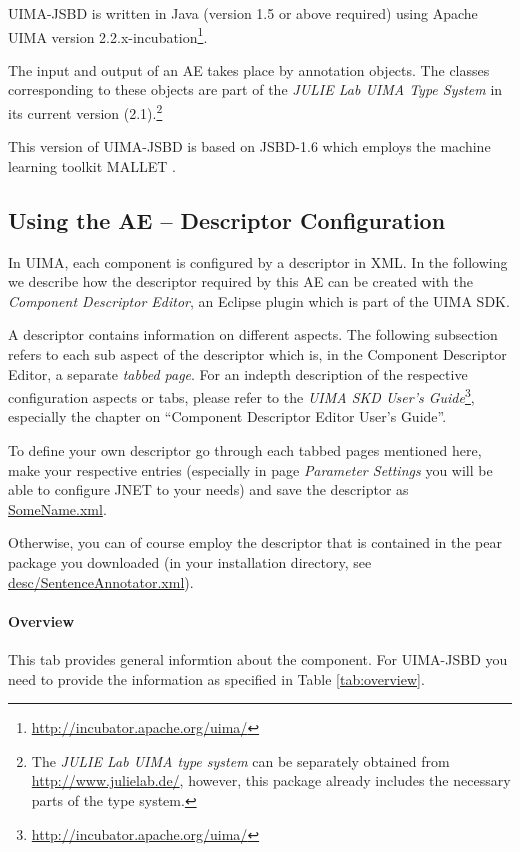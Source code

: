 \documentclass[11pt,a4paper,halfparskip]{scrartcl}
\begin{document}
UIMA-JSBD is written in Java (version 1.5 or above required) using
Apache UIMA version
2.2.x-incubation\footnote{\url{http://incubator.apache.org/uima/}}.

The input and output of an AE takes place by annotation objects. The
classes corresponding to these objects are part of the \emph{JULIE Lab
  UIMA Type System} in its current version (2.1).\footnote{The
  \emph{JULIE Lab UIMA type system} can be separately obtained from
  \url{http://www.julielab.de/}, however, this package already
  includes the necessary parts of the type system.}

This version of UIMA-JSBD is based on JSBD-1.6 which employs the
machine learning toolkit MALLET \cite{McCallum2002}.




\subsection{Using the AE -- Descriptor Configuration}

In UIMA, each component is configured by a descriptor in XML. In the
following we describe how the descriptor required by this AE can be
created with the \emph{Component Descriptor Editor}, an Eclipse plugin
which is part of the UIMA SDK.

A descriptor contains information on different aspects. The following
subsection refers to each sub aspect of the descriptor which is, in
the Component Descriptor Editor, a separate \emph{tabbed page}. For an
indepth description of the respective configuration aspects or tabs,
please refer to the \emph{UIMA SKD User's
  Guide}\footnote{\url{http://incubator.apache.org/uima/}}, especially
the chapter on ``Component Descriptor Editor User's Guide''.

To define your own descriptor go through each tabbed pages mentioned
here, make your respective entries (especially in page \emph{Parameter
  Settings} you will be able to configure JNET to your needs) and save
the descriptor as \url{SomeName.xml}.

Otherwise, you can of course employ the descriptor that is contained
in the pear package you downloaded (in your installation directory, see
\url{desc/SentenceAnnotator.xml}).

\paragraph{Overview}
This tab provides general informtion about the component. For 
UIMA-JSBD you need to provide the information as specified in Table
\ref{tab:overview}.
\end{document}

